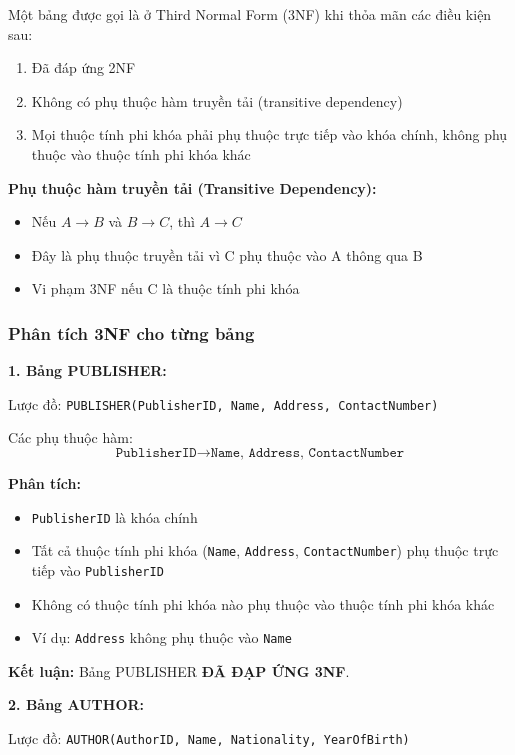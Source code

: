 \documentclass[12pt,a4paper]{article}
\begin{document}
Một bảng được gọi là ở Third Normal Form (3NF) khi thỏa mãn các điều kiện sau:
\begin{enumerate}
    \item Đã đáp ứng 2NF
    \item Không có phụ thuộc hàm truyền tải (transitive dependency)
    \item Mọi thuộc tính phi khóa phải phụ thuộc trực tiếp vào khóa chính, không phụ thuộc vào thuộc tính phi khóa khác
\end{enumerate}

\textbf{Phụ thuộc hàm truyền tải (Transitive Dependency):}
\begin{itemize}
    \item Nếu $A \rightarrow B$ và $B \rightarrow C$, thì $A \rightarrow C$
    \item Đây là phụ thuộc truyền tải vì C phụ thuộc vào A thông qua B
    \item Vi phạm 3NF nếu C là thuộc tính phi khóa
\end{itemize}

\subsubsection{Phân tích 3NF cho từng bảng}

\textbf{1. Bảng PUBLISHER:}

Lược đồ: \texttt{PUBLISHER(PublisherID, Name, Address, ContactNumber)}

Các phụ thuộc hàm:
$$ \texttt{PublisherID} \rightarrow \texttt{Name, Address, ContactNumber} $$

\textbf{Phân tích:}
\begin{itemize}
    \item \texttt{PublisherID} là khóa chính
    \item Tất cả thuộc tính phi khóa (\texttt{Name}, \texttt{Address}, \texttt{ContactNumber}) phụ thuộc trực tiếp vào \texttt{PublisherID}
    \item Không có thuộc tính phi khóa nào phụ thuộc vào thuộc tính phi khóa khác
    \item Ví dụ: \texttt{Address} không phụ thuộc vào \texttt{Name}
\end{itemize}

\textbf{Kết luận:} Bảng PUBLISHER \textbf{ĐÃ ĐẠP ỨNG 3NF}.

\vspace{0.3cm}

\textbf{2. Bảng AUTHOR:}

Lược đồ: \texttt{AUTHOR(AuthorID, Name, Nationality, YearOfBirth)}
\end{document}
